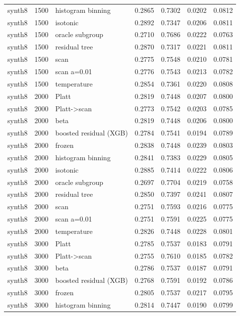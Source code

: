 \begin{tabular}{lllrrrr}
synth8 & 1500 & histogram binning & 0.2865 & 0.7302 & 0.0202 & 0.0812 \\
synth8 & 1500 & isotonic & 0.2892 & 0.7347 & 0.0206 & 0.0811 \\
synth8 & 1500 & oracle subgroup & 0.2710 & 0.7686 & 0.0222 & 0.0763 \\
synth8 & 1500 & residual tree & 0.2870 & 0.7317 & 0.0221 & 0.0811 \\
synth8 & 1500 & scan & 0.2775 & 0.7548 & 0.0210 & 0.0781 \\
synth8 & 1500 & scan a=0.01 & 0.2776 & 0.7543 & 0.0213 & 0.0782 \\
synth8 & 1500 & temperature & 0.2854 & 0.7361 & 0.0220 & 0.0808 \\
synth8 & 2000 & Platt & 0.2819 & 0.7448 & 0.0207 & 0.0800 \\
synth8 & 2000 & Platt->scan & 0.2773 & 0.7542 & 0.0203 & 0.0785 \\
synth8 & 2000 & beta & 0.2819 & 0.7448 & 0.0206 & 0.0800 \\
synth8 & 2000 & boosted residual (XGB) & 0.2784 & 0.7541 & 0.0194 & 0.0789 \\
synth8 & 2000 & frozen & 0.2838 & 0.7448 & 0.0239 & 0.0803 \\
synth8 & 2000 & histogram binning & 0.2841 & 0.7383 & 0.0229 & 0.0805 \\
synth8 & 2000 & isotonic & 0.2885 & 0.7414 & 0.0222 & 0.0806 \\
synth8 & 2000 & oracle subgroup & 0.2697 & 0.7704 & 0.0219 & 0.0758 \\
synth8 & 2000 & residual tree & 0.2850 & 0.7397 & 0.0241 & 0.0807 \\
synth8 & 2000 & scan & 0.2751 & 0.7593 & 0.0216 & 0.0775 \\
synth8 & 2000 & scan a=0.01 & 0.2751 & 0.7591 & 0.0225 & 0.0775 \\
synth8 & 2000 & temperature & 0.2826 & 0.7448 & 0.0228 & 0.0801 \\
synth8 & 3000 & Platt & 0.2785 & 0.7537 & 0.0183 & 0.0791 \\
synth8 & 3000 & Platt->scan & 0.2755 & 0.7610 & 0.0185 & 0.0782 \\
synth8 & 3000 & beta & 0.2786 & 0.7537 & 0.0187 & 0.0791 \\
synth8 & 3000 & boosted residual (XGB) & 0.2768 & 0.7591 & 0.0192 & 0.0786 \\
synth8 & 3000 & frozen & 0.2805 & 0.7537 & 0.0217 & 0.0795 \\
synth8 & 3000 & histogram binning & 0.2814 & 0.7447 & 0.0190 & 0.0799 \\

\end{tabular}
